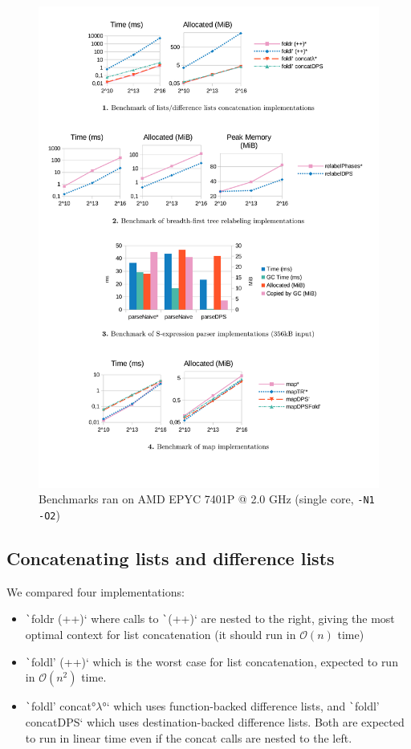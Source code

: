 \documentclass[english]{jflart}
\begin{document}
\begin{figure}[t]\centering
  \includegraphics[width=14cm]{bench-charts.pdf}
  \caption{Benchmarks ran on AMD EPYC 7401P @ 2.0 GHz (single core, \texttt{-N1 -O2})}
  \label{fig:bench-charts}
\end{figure}

\subsection{Concatenating lists and difference lists}\label{ssec:benchmark-dlist}

We compared four implementations:
\begin{itemize}
\item \texttt`foldr (++)` where calls to \texttt`(++)` are nested to the right, giving the most optimal context for list concatenation (it should run in $\mathcal{O}(n)$ time)
\item \texttt`foldl' (++)` which is the worst case for list concatenation, expected to run in $\mathcal{O}(n^2)$ time.
\item \texttt`foldl' concat°$\lambda$°` which uses function-backed difference lists, and \texttt`foldl' concatDPS` which uses destination-backed difference lists. Both are expected to run in linear time even if the concat calls are nested to the left.
\end{itemize}
\end{document}
